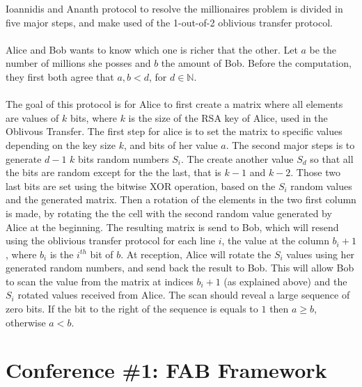 \documentclass[11pt,a4paper]{article}
\begin{document}
Ioannidis and Ananth protocol to
resolve
the millionaires problem \cite{ioannidis_efficient_2003}
is divided in five major steps, and make
used of the 1-out-of-2 oblivious transfer protocol.

\paragraph{}

Alice and Bob wants to know which one is richer that the other.
Let $a$ be the number of millions she posses and $b$ the amount
of Bob. Before the computation, they first both agree
that $a, b < d$, for $d \in \mathbb{N}$.

\paragraph{}

The goal of this protocol is for Alice to first create
a matrix where all elements are values of $k$ bits, where
$k$ is the size of the RSA key of Alice, used in the Oblivous Transfer.
The first step for alice is to set the matrix to specific values
depending on the key size $k$, and bits of her value $a$.
The second major steps is to generate $d - 1$ $k$ bits random
numbers $S_i$. The create another value $S_d$ so that all the
bits are random except for the the last, that is $k-1$ and $k-2$.
Those two last bits are set using the bitwise XOR operation,
based on the $S_i$ random values and the generated matrix.
Then a rotation of the elements in the two first column
is made, by rotating the the cell with the second random
value generated by Alice at the beginning. The resulting
matrix is send to Bob, which will resend using
the oblivious transfer protocol for each line $i$, the value
at the column $b_i + 1$, where $b_i$ is the $i^{th}$ bit of $b$.
At reception, Alice will rotate the $S_i$ values using
her generated random numbers, and send back the result to Bob.
This will allow Bob to scan the value from the matrix at indices $b_i + 1$
(as explained above) and the $S_i$ rotated values received from Alice.
The scan should reveal a large sequence of zero bits. If
the bit to the right of the sequence is equals to $1$ then
$a \ge b$, otherwise $a < b$.

\newpage

\section{Conference \#1: FAB Framework}
\end{document}
